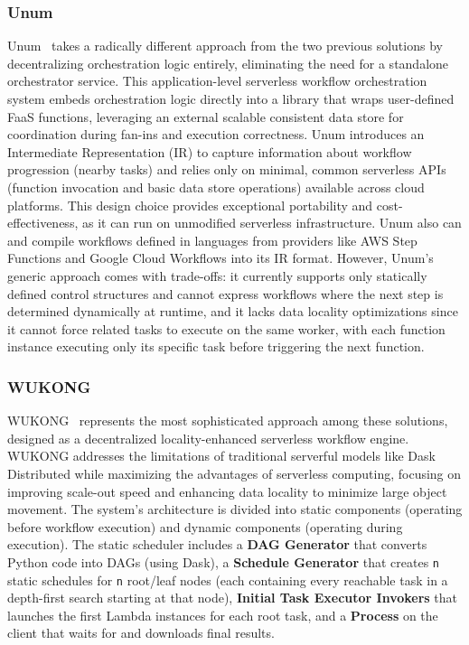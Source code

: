 \documentclass[conference]{IEEEtran}
\begin{document}
\subsubsection{Unum}
Unum~\cite{unum_decentralized_orchestrator} takes a radically different approach from the two previous solutions by decentralizing orchestration logic entirely, eliminating the need for a standalone orchestrator service. This application-level serverless workflow orchestration system embeds orchestration logic directly into a library that wraps user-defined FaaS functions, leveraging an external scalable consistent data store for coordination during fan-ins and execution correctness. Unum introduces an Intermediate Representation (IR) to capture information about workflow progression (nearby tasks) and relies only on minimal, common serverless APIs (function invocation and basic data store operations) available across cloud platforms. This design choice provides exceptional portability and cost-effectiveness, as it can run on unmodified serverless infrastructure. Unum also can and compile workflows defined in languages from providers like AWS Step Functions and Google Cloud Workflows into its IR format. However, Unum's generic approach comes with trade-offs: it currently supports only statically defined control structures and cannot express workflows where the next step is determined dynamically at runtime, and it lacks data locality optimizations since it cannot force related tasks to execute on the same worker, with each function instance executing only its specific task before triggering the next function.

\subsubsection{WUKONG}
\label{prw:wukong}
WUKONG~\cite{wukong_2} represents the most sophisticated approach among these solutions, designed as a decentralized locality-enhanced serverless workflow engine. WUKONG addresses the limitations of traditional serverful models like Dask Distributed while maximizing the advantages of serverless computing, focusing on improving scale-out speed and enhancing data locality to minimize large object movement. The system's architecture is divided into static components (operating before workflow execution) and dynamic components (operating during execution). The static scheduler includes a \textbf{DAG Generator} that converts Python code into DAGs (using Dask), a \textbf{Schedule Generator} that creates \texttt{n} static schedules for \texttt{n} root/leaf nodes (each containing every reachable task in a depth-first search starting at that node), \textbf{Initial Task Executor Invokers} that launches the first Lambda instances for each root task, and a \textbf{Process} on the client that waits for and downloads final results. 
\end{document}
